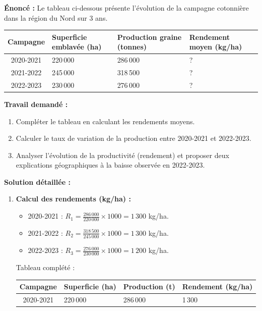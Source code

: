 \documentclass[11pt]{article}
\begin{document}
\begin{exoresolu}
\textbf{Énoncé :} Le tableau ci-dessous présente l'évolution de la campagne cotonnière dans la région du Nord sur 3 ans.
\begin{center}
\begin{tabularx}{\linewidth}{|c|X|X|X|}\hline
\rowcolor{popblueL} \textbf{Campagne} & \textbf{Superficie emblavée (ha)} & \textbf{Production graine (tonnes)} & \textbf{Rendement moyen (kg/ha)} \\ \hline
2020-2021 & 220\,000 & 286\,000 & ? \\ \hline
2021-2022 & 245\,000 & 318\,500 & ? \\ \hline
2022-2023 & 230\,000 & 276\,000 & ? \\ \hline
\end{tabularx}
\end{center}
\textbf{Travail demandé :}
\begin{enumerate}
    \item Compléter le tableau en calculant les rendements moyens.
    \item Calculer le taux de variation de la production entre 2020-2021 et 2022-2023.
    \item Analyser l'évolution de la productivité (rendement) et proposer deux explications géographiques à la baisse observée en 2022-2023.
\end{enumerate}
\tcblower
\textbf{Solution détaillée :}
\begin{enumerate}
    \item \textbf{Calcul des rendements (kg/ha) :}
    \begin{itemize}
        \item 2020-2021 : $R_1 = \frac{286\,000}{220\,000} \times 1000 = 1\,300$ kg/ha.
        \item 2021-2022 : $R_2 = \frac{318\,500}{245\,000} \times 1000 = 1\,300$ kg/ha.
        \item 2022-2023 : $R_3 = \frac{276\,000}{230\,000} \times 1000 = 1\,200$ kg/ha.
    \end{itemize}
    Tableau complété :
    \begin{center}
    \begin{tabularx}{\linewidth}{|c|X|X|X|}\hline
    \rowcolor{popblueL} \textbf{Campagne} & \textbf{Superficie (ha)} & \textbf{Production (t)} & \textbf{Rendement (kg/ha)} \\ \hline
    2020-2021 & 220\,000 & 286\,000 & 1\,300 \\ \hline

\end{tabularx}
\end{center}
\end{enumerate}
\end{exoresolu}
\end{document}
